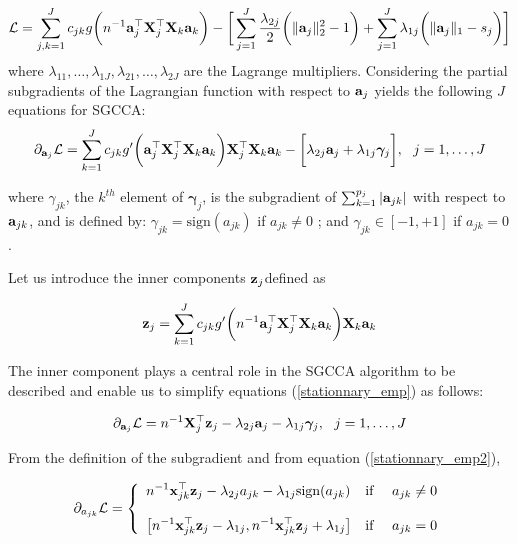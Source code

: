 \documentclass[
]{jss}
\begin{document}
\begin{equation}
\mathcal{L} = \sum_{j, k = 1}^J c_{jk}  g \bigg(n^{-1}\mathbf{a}_j^\top \mathbf{X}_j^\top\mathbf{X}_k \mathbf{a}_k \bigg) - \bigg[\sum_{j=1}^J\frac{\lambda_{2j}}{2}\bigg(\Vert \mathbf{a}_j \Vert_2^2-1\bigg) + \sum_{j=1}^J\lambda_{1j}\bigg(\Vert \mathbf{a}_j \Vert_1 - s_j\bigg) \bigg] 
\label{Lagrangian_SGCCA}
\end{equation} where
\(\lambda_{11}, \ldots, \lambda_{1J}, \lambda_{21}, \ldots, \lambda_{2J}\)
are the Lagrange multipliers. Considering the partial subgradients of
the Lagrangian function with respect to \(\mathbf{a}_j\) yields the following
\(J\) equations for SGCCA: \begin{equation}
\partial_{\mathbf{a}_j} \mathcal{L} = 
\sum_{k=1}^J c_{jk}g'\bigg(\mathbf{a}_j^\top \mathbf{X}_j^\top\mathbf{X}_k \mathbf{a}_k \bigg) \mathbf{X}_j^\top\mathbf{X}_k\mathbf{a}_k - \bigg[\lambda_{2j}\mathbf{a}_j + \lambda_{1j}\boldsymbol{\gamma}_j \bigg],\text{~~}j= 1 , \ldots, J
\label{stationnary_emp}
\end{equation}

where \(\gamma_{jk}\), the \(k^{th}\) element of
\(\boldsymbol{\gamma}_j\), is the subgradient of
\(\sum_{k=1}^{p_j} \vert \mathbf{a}_{jk} \vert\) with respect to
\(\mathbf{a}_{jk}\), and is defined by: \(\gamma_{jk} = \text{sign}(a_{jk})\)
if \(a_{jk} \ne 0\) ; and \(\gamma_{jk} \in [-1, +1 ]\) if \(a_{jk}=0\).

Let us introduce the inner components \(\mathbf{z}_j\)defined as

\begin{equation}
\mathbf{z}_j =  \displaystyle \sum_{k=1}^J c_{jk} g'\bigg(n^{-1}\mathbf{a}_j^\top \mathbf{X}_j^\top\mathbf{X}_k \mathbf{a}_k \bigg) \mathbf{X}_k\mathbf{a}_k
\end{equation}

The inner component plays a central role in the SGCCA algorithm to be
described and enable us to simplify equations (\ref{stationnary_emp}) as
follows:

\begin{equation}
\partial_{\mathbf{a}_j} \mathcal{L} = 
n^{-1} \mathbf{X}_j^\top\mathbf{z}_j -\lambda_{2j}\mathbf{a}_j - \lambda_{1j}\boldsymbol{\gamma}_j, \text{~~}j= 1 , \ldots, J
\label{stationnary_emp2}
\end{equation}

From the definition of the subgradient and from equation
(\ref{stationnary_emp2}),

\begin{equation}
\partial_{a_{jk}} \mathcal{L}=
\left \lbrace
\begin{array}{ll}
\displaystyle n^{-1} \mathbf{x}_{jk}^\top\mathbf{z}_j  -\lambda_{2j}a_{jk} - \lambda_{1j}\text{sign}(a_{jk}) & \text{if~~~~} a_{jk} \ne 0\\\\
\displaystyle \left[n^{-1} \mathbf{x}_{jk}^\top\mathbf{z}_j  - \lambda_{1j} , n^{-1} \mathbf{x}_{jk}^\top\mathbf{z}_j  + \lambda_{1j}\right] & \text{if~~~~}a_{jk}=0
\end{array}
\right.
\label{eq_stat}
\end{equation}
\end{document}
